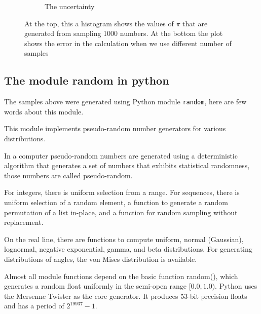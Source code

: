 \begin{figure}
\begin{subfigure}[b]{0.5\textwidth}
        \caption{The uncertainty}
        \label{fig:tiger}
    \end{subfigure}
    \label{Fig:1}
\caption{At the top, this a histogram shows the values of $\pi$ that are generated from sampling 1000 numbers. At the bottom the plot shows the error in the calculation when we use different number of samples} 
\label{fig:1.1}
\end{figure}



\subsection{The module random in python}

The samples above were generated using Python module \verb+random+, here are few words about this module.

 
This module implements pseudo-random number generators for various distributions.

In a computer pseudo-random numbers are generated using a deterministic algorithm that generates a set of numbers that exhibits statistical randomness, those numbers are called pseudo-random.

For integers, there is uniform selection from a range. For sequences, there is uniform selection of a random element, a function to generate a random permutation of a list in-place, and a function for random sampling without replacement.

On the real line, there are functions to compute uniform, normal (Gaussian), lognormal, negative exponential, gamma, and beta distributions. For generating distributions of angles, the von Mises distribution is available.

Almost all module functions depend on the basic function random(), which generates a random float uniformly in the semi-open range $[0.0, 1.0)$. Python uses the Mersenne Twister as the core generator. It produces 53-bit precision floats and has a period of $2^{19937}-1$\citep{python}.
